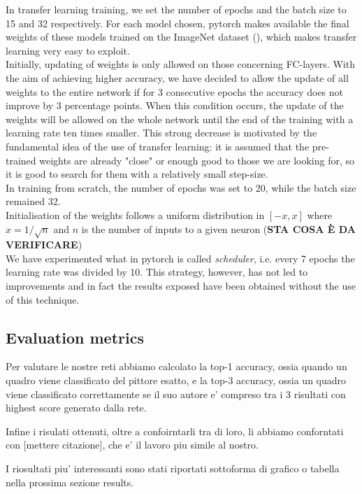 \documentclass{article}
\begin{document}
In transfer learning training, we set the number of epochs and the batch size to 15 and 32 respectively.  For each model chosen, pytorch makes available the final weights of these models trained on the ImageNet dataset (\cite{imagenet}), which makes transfer learning very easy to exploit.\\
Initially, updating of weights is only allowed on those concerning FC-layers. With the aim of achieving higher accuracy, we have decided to allow the update of all weights to the entire network if for 3 consecutive epochs the accuracy does not improve by 3 percentage points. When this condition occurs, the update of the weights will be allowed on the whole network until the end of the training with a learning rate ten times smaller. This strong decrease is motivated by the fundamental idea of the use of transfer learning: it is assumed that the pre-trained weights are already "close" or enough good to those we are looking for, so it is good to search for them with a relatively small step-size.
\\

In training from scratch, the number of epochs was set to 20, while the batch size remained 32.\\ 
Initialisation of the weights follows a uniform distribution in $[-x, x]$ where $x=1/\sqrt n$ and $n$ is the number of inputs to a given neuron (\textbf{STA COSA È DA VERIFICARE})\\
We have experimented what in pytorch is called \textit{scheduler}, i.e. every 7 epochs the learning rate was divided by 10. This strategy, however, has not led to improvements and in fact the results exposed have been obtained without the use of this technique.

\subsection{Evaluation metrics}
Per valutare le nostre reti abbiamo calcolato la top-1 accuracy, ossia quando un quadro viene classificato del pittore esatto, e la top-3 accuracy, ossia un quadro viene classificato correttamente se il suo autore e' compreso tra i 3 risultati con highest score generato dalla rete.

Infine i risulati ottenuti, oltre a confoirntarli tra di loro, li abbiamo conforntati con [mettere citazione], che e' il lavoro piu simile al nostro.

I riosultati piu' interessanti sono stati riportati sottoforma di grafico o tabella nella prossima sezione results.
\end{document}
